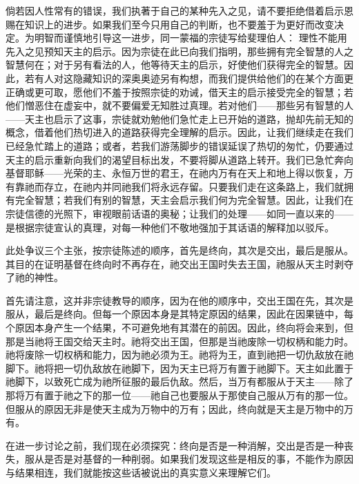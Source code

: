 倘若因人性常有的错误，我们执著于自己的某种先入之见，请不要拒绝借着启示恩赐在知识上的进步。如果我们至今只用自己的判断，也不要羞于为更好而改变决定。为明智而谨慎地引导这一进步，同一蒙福的宗徒写给斐理伯人： 理性不能用先入之见预知天主的启示。因为宗徒在此已向我们指明，那些拥有完全智慧的人之智慧何在；对于另有看法的人，他等待天主的启示，好使他们获得完全的智慧。因此，若有人对这隐藏知识的深奥奥迹另有构想，而我们提供给他们的在某个方面更正确或更可取，愿他们不羞于按照宗徒的劝诫，借天主的启示接受完全的智慧；若他们憎恶住在虚妄中，就不要偏爱无知胜过真理。若对他们——那些另有智慧的人——天主也启示了这事，宗徒就劝勉他们急忙走上已开始的道路，抛却先前无知的概念，借着他们热切进入的道路获得完全理解的启示。因此，让我们继续走在我们已经急忙踏上的道路；或者，若我们游荡脚步的错误延误了热切的匆忙，仍要通过天主的启示重新向我们的渴望目标出发，不要将脚从道路上转开。我们已急忙奔向基督耶稣——光荣的主、永恒万世的君王，在祂内万有在天上和地上得以恢复，万有靠祂而存立，在祂内并同祂我们将永远存留。只要我们走在这条路上，我们就拥有完全智慧；若我们有别的智慧，天主会启示我们何为完全智慧。因此，让我们在宗徒信德的光照下，审视眼前话语的奥秘；让我们的处理——如同一直以来的——是根据宗徒宣认的真理，对每一种他们不敬地强加于其话语的解释加以驳斥。\par

此处争议三个主张，按宗徒陈述的顺序，首先是终向，其次是交出，最后是服从。其目的在证明基督在终向时不再存在，祂交出王国时失去王国，祂服从天主时剥夺了祂的神性。\par

首先请注意，这并非宗徒教导的顺序，因为在他的顺序中，交出王国在先，其次是服从，最后是终向。但每一个原因本身是其特定原因的结果，因此在因果链中，每个原因本身产生一个结果，不可避免地有其潜在的前因。因此，终向将会来到，但那是当祂将王国交给天主时。祂将交出王国，但那是当祂废除一切权柄和能力时。祂将废除一切权柄和能力，因为祂必须为王。祂将为王，直到祂把一切仇敌放在祂脚下。祂将把一切仇敌放在祂脚下，因为天主已将万有置于祂脚下。天主如此置于祂脚下，以致死亡成为祂所征服的最后仇敌。然后，当万有都服从于天主——除了那将万有置于祂之下的那一位——祂自己也要服从于那使自己服从万有的那一位。但服从的原因无非是使天主成为万物中的万有；因此，终向就是天主是万物中的万有。\par

在进一步讨论之前，我们现在必须探究：终向是否是一种消解，交出是否是一种丧失，服从是否是对基督的一种削弱。如果我们发现这些是相反的事，不能作为原因与结果相连，我们就能按这些话被说出的真实意义来理解它们。\par

